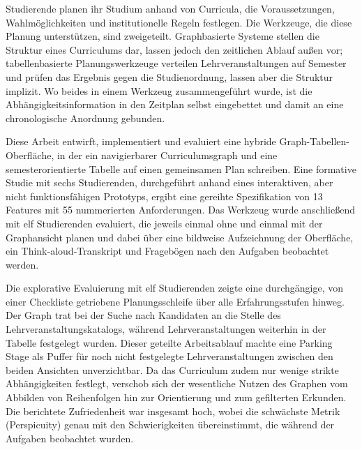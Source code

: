 Studierende planen ihr Studium anhand von Curricula, die Voraussetzungen, Wahlmöglichkeiten und institutionelle Regeln festlegen. Die Werkzeuge, die diese Planung unterstützen, sind zweigeteilt. Graphbasierte Systeme stellen die Struktur eines Curriculums dar, lassen jedoch den zeitlichen Ablauf außen vor; tabellenbasierte Planungswerkzeuge verteilen Lehrveranstaltungen auf Semester und prüfen das Ergebnis gegen die Studienordnung, lassen aber die Struktur implizit. Wo beides in einem Werkzeug zusammengeführt wurde, ist die Abhängigkeitsinformation in den Zeitplan selbst eingebettet und damit an eine chronologische Anordnung gebunden.

Diese Arbeit entwirft, implementiert und evaluiert eine hybride Graph-Tabellen-Oberfläche, in der ein navigierbarer Curriculumsgraph und eine semesterorientierte Tabelle auf einen gemeinsamen Plan schreiben. Eine formative Studie mit sechs Studierenden, durchgeführt anhand eines interaktiven, aber nicht funktionsfähigen Prototyps, ergibt eine gereihte Spezifikation von 13 Features mit 55 nummerierten Anforderungen. Das Werkzeug wurde anschließend mit elf Studierenden evaluiert, die jeweils einmal ohne und einmal mit der Graphansicht planen und dabei über eine bildweise Aufzeichnung der Oberfläche, ein Think-aloud-Transkript und Fragebögen nach den Aufgaben beobachtet werden.

Die explorative Evaluierung mit elf Studierenden zeigte eine durchgängige, von einer Checkliste getriebene Planungsschleife über alle Erfahrungsstufen hinweg. Der Graph trat bei der Suche nach Kandidaten an die Stelle des Lehrveranstaltungskatalogs, während Lehrveranstaltungen weiterhin in der Tabelle festgelegt wurden. Dieser geteilte Arbeitsablauf machte eine Parking Stage als Puffer für noch nicht festgelegte Lehrveranstaltungen zwischen den beiden Ansichten unverzichtbar. Da das Curriculum zudem nur wenige strikte Abhängigkeiten festlegt, verschob sich der wesentliche Nutzen des Graphen vom Abbilden von Reihenfolgen hin zur Orientierung und zum gefilterten Erkunden. Die berichtete Zufriedenheit war insgesamt hoch, wobei die schwächste Metrik (Perspicuity) genau mit den Schwierigkeiten übereinstimmt, die während der Aufgaben beobachtet wurden.